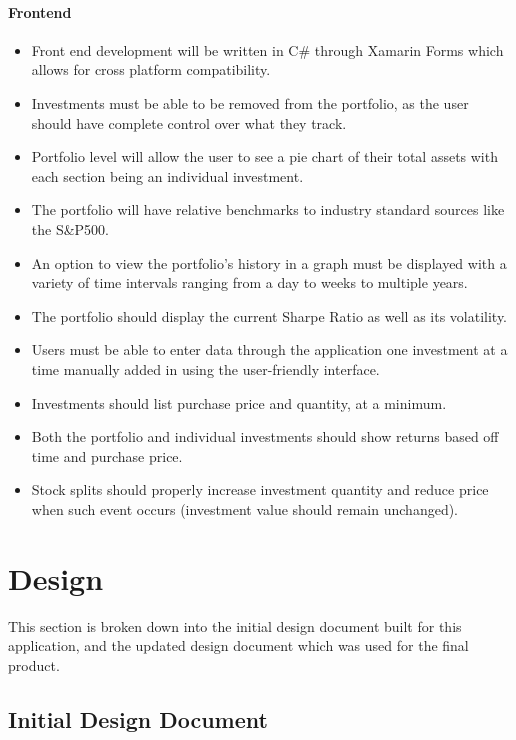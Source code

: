 \documentclass[onecolumn, draftclsnofoot,10pt, compsoc]{IEEEtran}
\begin{document}
\paragraph{Frontend}
\begin{itemize}
	\item Front end development will be written in C\# through Xamarin Forms which allows for cross platform compatibility. 
	\item Investments must be able to be removed from the portfolio, as the user should 
		have complete control over what they track. 
	\item Portfolio level will allow the user to see a pie chart of their total assets with each section being an individual investment.
	\item The portfolio will have relative benchmarks to industry standard sources like the S\&P500.
	\item An option to view the portfolio's history in a graph must be displayed with a variety of time intervals ranging from a day to weeks to multiple years.
	\item The portfolio should display the current Sharpe Ratio as well as its volatility.
	\item Users must be able to enter data through the application one investment at a time manually added in using the user-friendly interface. 
	\item Investments should list purchase price and quantity, at a minimum.
	\item Both the portfolio and individual investments should show returns based off time and purchase price.
	\item Stock splits should properly increase investment quantity and reduce price when such event occurs (investment value should remain unchanged).

	
     \end{itemize}

\newpage




\section{Design}

This section is broken down into the initial design document built for this application, and the updated design document which was used for the final product.
\subsection{Initial Design Document}
\end{document}
